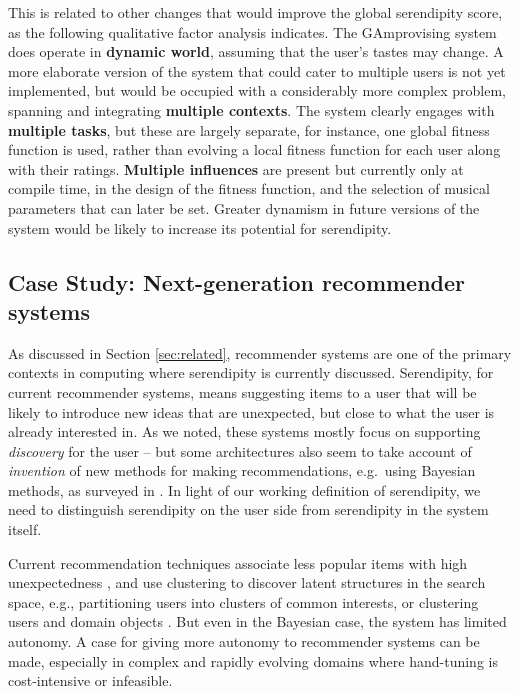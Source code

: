 This is related to other changes that would improve the global serendipity score, as the following qualitative factor analysis indicates.
%
The {\sf GAmprovising} system does operate in \textbf{dynamic world},
assuming that the user's tastes may change.  A more elaborate version
of the system that could cater to multiple users is not yet
implemented, but would be occupied with a considerably more complex
problem, spanning and integrating \textbf{multiple contexts}.  The
system clearly engages with \textbf{multiple tasks}, but these are
largely separate, for instance, one global fitness function is used,
rather than evolving a local fitness function for each user along with
their ratings.  \textbf{Multiple influences} are present but currently
only at compile time, in the design of the fitness function, and the
selection of musical parameters that can later be set.  Greater
dynamism in future versions of the system would be likely to increase
its potential for serendipity.

\subsection{Case Study: Next-generation recommender systems} \label{sec:nextgenrec}
As discussed in Section \ref{sec:related}, recommender systems are one
of the primary contexts in computing where serendipity is currently discussed.  Serendipity, for current recommender systems, means suggesting items to a user that will be likely to introduce new ideas that are unexpected, but close to what the user is already interested in.  As we noted, these systems mostly focus on supporting \emph{discovery} for the user -- but some architectures also seem to take account of \emph{invention} of new methods for making recommendations, e.g.~using Bayesian methods, as surveyed in .  In light of our working definition of serendipity, we need to distinguish serendipity on the user side from serendipity in the system itself.

Current recommendation techniques associate less popular items with high unexpectedness \cite{Herlocker2004,Lu2012}, and use clustering to discover latent structures in the search space, e.g., partitioning users into clusters of common interests, or clustering users and domain objects \cite{Kamahara2005,Onuma2009,Zhang2011}.  But even in the Bayesian case, the system has limited autonomy.  A case for giving more autonomy to recommender systems can be made, especially in complex and rapidly evolving domains where hand-tuning is cost-intensive or infeasible.

